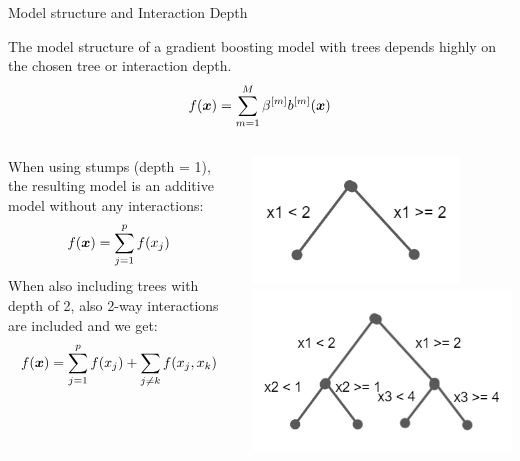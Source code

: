 \begin{vbframe}{Model structure and Interaction Depth}

The model structure of a gradient boosting model with trees depends highly on the chosen
tree or interaction depth.
$$
f(\bm{x}) =  \sum_{m=1}^M \beta^{[m]} b^{[m]}(\bm{x})
$$

\lz
\begin{footnotesize}
\begin{columns}[T]
\begin{column}{0.6\textwidth}
When using stumps (depth = 1), the resulting model is an additive model without any interactions:\\
$$
f(\bm{x}) = \sum_{j=1}^p f(x_j)
$$
When also including trees with depth of 2, also 2-way interactions are included and we get:\\
$$
f(\bm{x}) = \sum_{j=1}^p f(x_j) + \sum_{j \neq k} f(x_j, x_k)
$$
\end{column}
\begin{column}{0.4\textwidth}
\includegraphics[width=0.8\textwidth]{figure/boosting_interact_expl1.PNG}
\includegraphics[width=\textwidth]{figure/boosting_interact_expl2.PNG}
\end{column}
\end{columns}
\end{footnotesize}


\end{vbframe}

